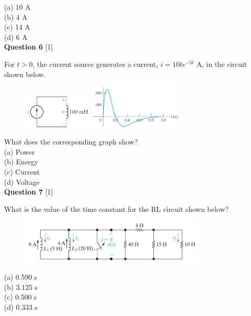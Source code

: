 \documentclass[12pt]{article}
\begin{document}
\noindent
(a) 10 A\\
(b) 4 A\\
(c) 14 A\\
(d) 6 A \\%

\noindent
{\bf Question 6} [1]

For $ t > 0$, the current source generates a current, $i = 10 t e^{-5t}$ A, in the circuit shown below. 
\begin{figure}[h!]
\centering 
\includegraphics[clip,width=0.3\textwidth]{Fig6-1.png}
\includegraphics[clip,width=0.4\textwidth]{Fig6-8p.png}
\end{figure}

What does the corresponding graph show?\\

\noindent
(a) Power \\%
(b) Energy\\
(c) Current\\
(d) Voltage\\

\newpage
\noindent
{\bf Question 7} [1]

What is the value of the time constant for the RL circuit shown below?
\begin{figure}[h!]
\centering 
\includegraphics[clip,width=0.8\textwidth]{Fig7-10.png}
\end{figure}

\noindent
(a) 0.590 s\\
(b) 3.125 s\\
(c) 0.500 s \\%
(d) 0.333 s\\
\end{document}
